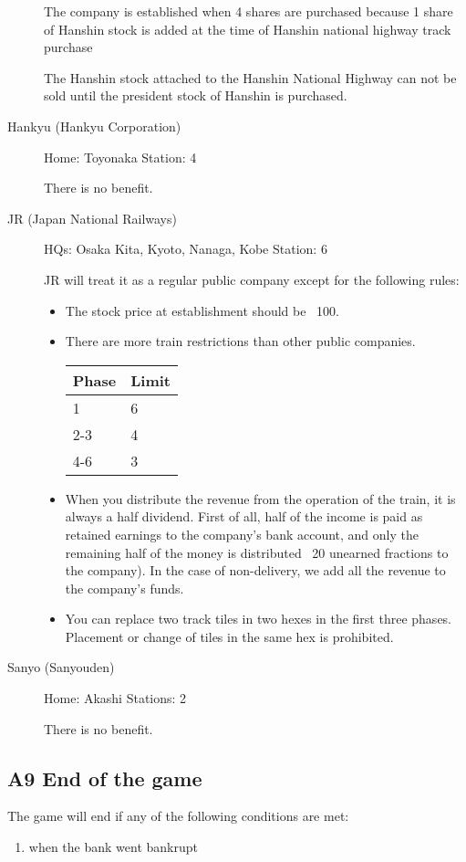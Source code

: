 \documentclass{article}
\begin{document}
\begin{CJK}{UTF8}{min}
\begin{description}
  The company is established when 4 shares are purchased because 1
  share of Hanshin stock is added at the time of Hanshin national
  highway track purchase

  The Hanshin stock attached to the Hanshin National Highway can not
  be sold until the president stock of Hanshin is purchased.

\item[Hankyu (Hankyu Corporation)] Home: Toyonaka Station: 4

  There is no benefit.

\item[JR (Japan National Railways)]

HQs: Osaka Kita, Kyoto, Nanaga, Kobe Station: 6

JR will treat it as a regular public company except for the following rules:
\begin{itemize}
\item The stock price at establishment should be \ 100.
\item There are more train restrictions than other public companies.

\begin{tabular}{ll}
  Phase & Limit \\
  \hline
  1 &  6 \\
  2-3 & 4 \\
  4-6 & 3
\end{tabular}
\item When you distribute the revenue from the operation of the train,
  it is always a half dividend. First of all, half of the income is
  paid as retained earnings to the company's bank account, and only
  the remaining half of the money is distributed \ 20 unearned
  fractions to the company). In the case of non-delivery, we add all
  the revenue to the company's funds.
\item You can replace two track tiles in two hexes in the first three
  phases. Placement or change of tiles in the same hex is prohibited.
\end{itemize}

\item[Sanyo (Sanyouden)] Home: Akashi Stations: 2

There is no benefit.
\end{description}
\subsection*{A9 End of the game}

The game will end if any of the following conditions are met:
\begin{enumerate}
\item when the bank went bankrupt


\end{enumerate}
\end{CJK}
\end{document}
